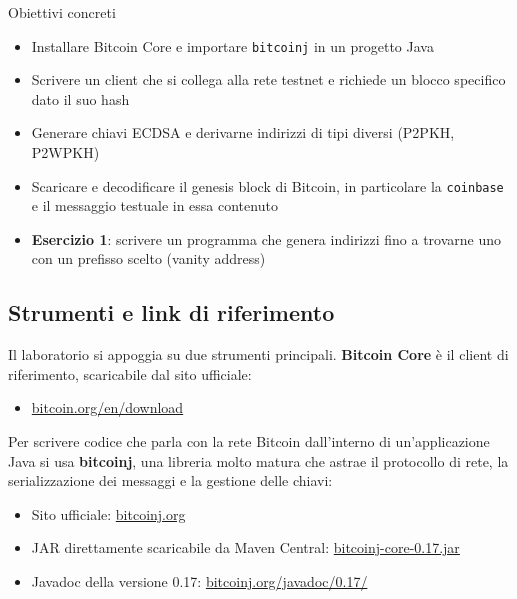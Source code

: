 \documentclass[
  italian,
  openany]{book}
\providecommand{\tightlist}{%
  \setlength{\itemsep}{0pt}\setlength{\parskip}{0pt}}
\begin{document}
\begin{calloutnote}{Obiettivi concreti}

\begin{itemize}
\tightlist
\item
  Installare Bitcoin Core e importare \texttt{bitcoinj} in un progetto
  Java
\item
  Scrivere un client che si collega alla rete testnet e richiede un
  blocco specifico dato il suo hash
\item
  Generare chiavi ECDSA e derivarne indirizzi di tipi diversi (P2PKH,
  P2WPKH)
\item
  Scaricare e decodificare il genesis block di Bitcoin, in particolare
  la \texttt{coinbase} e il messaggio testuale in essa contenuto
\item
  \textbf{Esercizio 1}: scrivere un programma che genera indirizzi fino
  a trovarne uno con un prefisso scelto (vanity address)
\end{itemize}

\end{calloutnote}

\subsection{Strumenti e link di
riferimento}\label{strumenti-e-link-di-riferimento}

Il laboratorio si appoggia su due strumenti principali. \textbf{Bitcoin
Core} è il client di riferimento, scaricabile dal sito ufficiale:

\begin{itemize}
\tightlist
\item
  \href{https://bitcoin.org/en/download}{bitcoin.org/en/download}
\end{itemize}

Per scrivere codice che parla con la rete Bitcoin dall'interno di
un'applicazione Java si usa \textbf{bitcoinj}, una libreria molto matura
che astrae il protocollo di rete, la serializzazione dei messaggi e la
gestione delle chiavi:

\begin{itemize}
\tightlist
\item
  Sito ufficiale: \href{https://bitcoinj.org/}{bitcoinj.org}
\item
  JAR direttamente scaricabile da Maven Central:
  \href{https://search.maven.org/remotecontent?filepath=org/bitcoinj/bitcoinj-core/0.17/bitcoinj-core-0.17.jar}{bitcoinj-core-0.17.jar}
\item
  Javadoc della versione 0.17:
  \href{https://bitcoinj.org/javadoc/0.17/}{bitcoinj.org/javadoc/0.17/}
\end{itemize}
\end{document}
